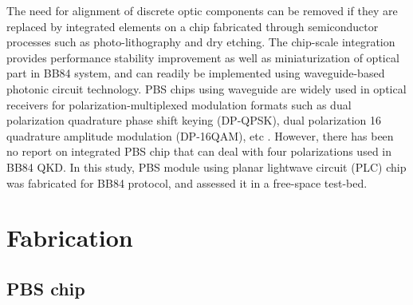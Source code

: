 \documentclass[letterpaper, 10pt]{article}
\begin{document}
The need for alignment of discrete optic components can be removed if they are replaced by integrated elements on a chip
fabricated through semiconductor processes such as photo-lithography and dry etching.
The chip-scale integration provides performance stability improvement as well as miniaturization of optical part in BB84 system, and can readily be implemented using waveguide-based photonic circuit technology.
PBS chips using waveguide are widely used in optical receivers for polarization-multiplexed modulation formats such as dual polarization quadrature phase shift keying (DP-QPSK), dual polarization 16 quadrature amplitude modulation (DP-16QAM), etc  \cite{Lee:2016bg,PoDong:2014kj}.
However, there has been no report on integrated PBS chip that can deal with four polarizations used in BB84 QKD.
In this study, PBS module using  planar lightwave circuit (PLC) chip was fabricated for BB84 protocol, and assessed it in a free-space test-bed.

\section{Fabrication}
\subsection{PBS chip}
\end{document}
